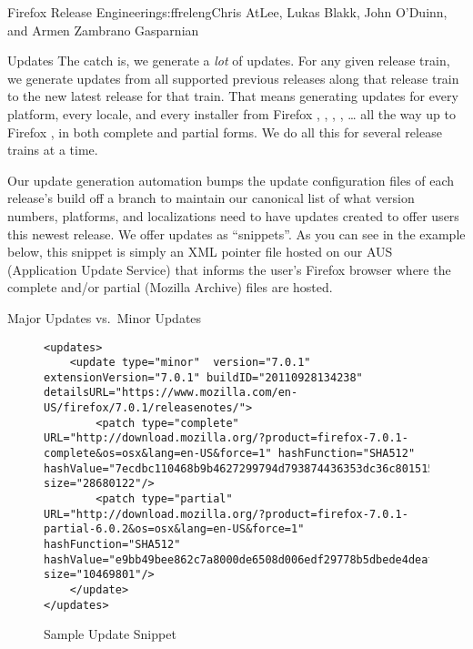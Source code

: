 \begin{aosachapter}{Firefox Release Engineering}{s:ffreleng}{Chris AtLee, Lukas Blakk, John O'Duinn, and Armen Zambrano Gasparnian}
\begin{aosasect1}{Updates}
The catch is, we generate a \emph{lot} of updates. For any given release
train, we generate updates from all supported previous releases along
that release train to the new latest release for that train.  That
means generating updates for every platform, every locale, and every
installer from Firefox , , , , {\ldots} all the way up to Firefox
, in both complete and partial forms. We do all this for several
release trains at a time.

Our update generation automation bumps the update configuration files
of each release's build off a branch to maintain our canonical list of
what version numbers, platforms, and localizations need to have
updates created to offer users this newest release. We offer updates
as ``snippets''. As you can see in the example below, this snippet is
simply an XML pointer file hosted on our AUS (Application Update
Service) that informs the user's Firefox browser where the complete
and/or partial  (Mozilla Archive) files are hosted.

\begin{aosasect2}{Major Updates vs.\ Minor Updates}

\begin{figure}  
\begin{verbatim}
<updates>
    <update type="minor"  version="7.0.1" extensionVersion="7.0.1" buildID="20110928134238" detailsURL="https://www.mozilla.com/en-US/firefox/7.0.1/releasenotes/">
        <patch type="complete" URL="http://download.mozilla.org/?product=firefox-7.0.1-complete&os=osx&lang=en-US&force=1" hashFunction="SHA512" hashValue="7ecdbc110468b9b4627299794d793874436353dc36c80151550b08830f9d8c5afd7940c51df9270d54e11fd99806f41368c0f88721fa17e01ea959144f473f9d" size="28680122"/>
        <patch type="partial" URL="http://download.mozilla.org/?product=firefox-7.0.1-partial-6.0.2&os=osx&lang=en-US&force=1" hashFunction="SHA512" hashValue="e9bb49bee862c7a8000de6508d006edf29778b5dbede4deaf3cfa05c22521fc775da126f5057621960d327615b5186b27d75a378b00981394716e93fc5cca11a" size="10469801"/>
    </update>
</updates>
\end{verbatim}
\caption{Sample Update Snippet}
\label{fig.ffreleng.snippet}
\end{figure}


\end{aosasect2}
\end{aosasect1}
\end{aosachapter}
